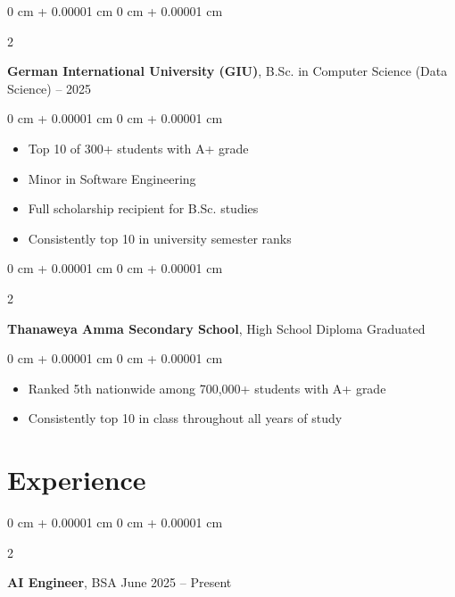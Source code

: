 \documentclass[10pt, letterpaper]{article}
\newenvironment{highlights}{
    \begin{itemize}[
        topsep=0.10 cm,
        parsep=0.10 cm,
        partopsep=0pt,
        itemsep=0pt,
        leftmargin=0 cm + 10pt
    ]
}{
    \end{itemize}
} %
\newenvironment{onecolentry}{
    \begin{adjustwidth}{
        0 cm + 0.00001 cm
    }{
        0 cm + 0.00001 cm
    }
}{
    \end{adjustwidth}
} %
\newenvironment{twocolentry}[2][]{
    \onecolentry
    \def\secondColumn{#2}
    \setcolumnwidth{\fill, 4.5 cm}
    \begin{paracol}{2}
}{
    \switchcolumn \raggedleft \secondColumn
    \end{paracol}
    \endonecolentry
} %
\begin{document}
        \vspace{0.2 cm}

        \begin{twocolentry}{
            2022 – 2025
        }
            \textbf{German International University (GIU)}, B.Sc. in Computer Science (Data Science)\end{twocolentry}

        \vspace{0.10 cm}
        \begin{onecolentry}
            \begin{highlights}
                \item Top 10 of 300+ students with A+ grade
                \item Minor in Software Engineering
                \item Full scholarship recipient for B.Sc. studies
                \item Consistently top 10 in university semester ranks
            \end{highlights}
        \end{onecolentry}

        \vspace{0.2 cm}

        \begin{twocolentry}{
            Graduated
        }
            \textbf{Thanaweya Amma Secondary School}, High School Diploma\end{twocolentry}

        \vspace{0.10 cm}
        \begin{onecolentry}
            \begin{highlights}
                \item Ranked 5th nationwide among 700,000+ students with A+ grade
                \item Consistently top 10 in class throughout all years of study
            \end{highlights}
        \end{onecolentry}

    \section{Experience}

        \begin{twocolentry}{
            June 2025 – Present
        }
            \textbf{AI Engineer}, BSA\end{twocolentry}
\end{document}
